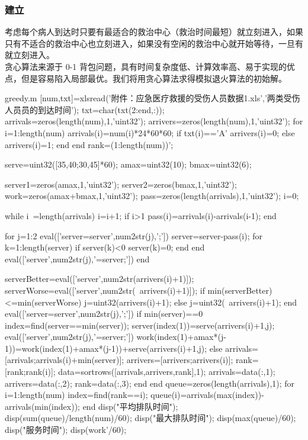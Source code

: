 \documentclass{article}
\begin{document}
\subsubsection{建立}
考虑每个病人到达时只要有最适合的救治中心（救治时间最短）就立刻进入，如果只有不适合的救治中心也立刻进入，如果没有空闲的救治中心就开始等待，一旦有就立刻进入。
\\\indent 贪心算法来源于 0-1 背包问题，具有时间复杂度低、计算效率高、易于实现的优点，但是容易陷入局部最优。\cite{1}我们将用贪心算法求得模拟退火算法的初始解。
\begin{matlab}{greedy.m}
[num,txt]=xlsread('附件：应急医疗救援的受伤人员数据1.xls','两类受伤人员员的到达时间');
txt=char(txt(2:end,:));
arrivals=zeros(length(num),1,'uint32');
arrivers=zeros(length(num),1,'uint32');
for i=1:length(num)
	arrivals(i)=num(i)*24*60*60;%
	if txt(i)=='A'
		arrivers(i)=0;
	else
		arrivers(i)=1;
	end
end
rank=(1:length(num))';

serve=uint32([35,40;30,45]*60);
amax=uint32(10);
bmax=uint32(6);

server1=zeros(amax,1,'uint32');
server2=zeros(bmax,1,'uint32');
work=zeros(amax+bmax,1,'uint32');
pass=zeros(length(arrivals),1,'uint32');
i=0;%

while i~=length(arrivals)
	i=i+1;
	if i>1
		pass(i)=arrivals(i)-arrivals(i-1);
	end
	
	for j=1:2%
		eval(['server=server',num2str(j),';'])
		server=server-pass(i);%
		for k=1:length(server)
			if server(k)<0
				server(k)=0;
			end
		end
		eval(['server',num2str(j),'=server;'])
	end
	
	serverBetter=eval(['server',num2str(arrivers(i)+1)]);%
	serverWorse=eval(['server',num2str(~arrivers(i)+1)]);
	if min(serverBetter)<=min(serverWorse)%
		j=uint32(arrivers(i)+1);
	else
		j=uint32(~arrivers(i)+1);
	end
	eval(['server=server',num2str(j),';'])
	if min(server)==0%
		index=find(server==min(server));
		server(index(1))=serve(arrivers(i)+1,j);%
		eval(['server',num2str(j),'=server;'])
		work(index(1)+amax*(j-1))=work(index(1)+amax*(j-1))+serve(arrivers(i)+1,j);
	else
		arrivals=[arrivals;arrivals(i)+min(server)];
		arrivers=[arrivers;arrivers(i)];
		rank=[rank;rank(i)];
		data=sortrows([arrivals,arrivers,rank],1);
		arrivals=data(:,1);
		arrivers=data(:,2);
		rank=data(:,3);
	end
end
queue=zeros(length(arrivals),1);
for i=1:length(num)
	index=find(rank==i);
	queue(i)=arrivals(max(index))-arrivals(min(index));
end
disp("平均排队时间");
disp(sum(queue)/length(num)/60);
disp("最大排队时间");
disp(max(queue)/60);
disp("服务时间");
disp(work'/60);
\end{matlab}
\end{document}

